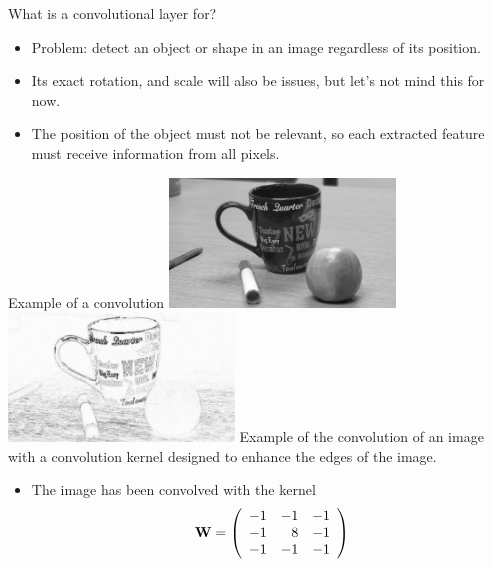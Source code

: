 \documentclass{beamer}
\begin{document}
\begin{frame}{What is a convolutional layer for?}

\begin{itemize}
\item Problem: detect an object or shape in an image regardless of its position.

\item Its exact rotation, and scale will also be issues, but let's not mind this for now.

\item The position of the object must not be relevant, so each extracted  feature must receive information from all pixels.
\end{itemize}
\end{frame}
\begin{frame}{Example of a convolution}
\includegraphics[width=0.45\textwidth]{Module 4 (CNN)/pics/I.jpg}
    \includegraphics[width=0.45\textwidth]{Module 4 (CNN)/pics/O_processed.png}
    {Example of the convolution of an image with a convolution kernel designed to enhance the edges of the image. }
\begin{itemize}
    \item The image has been convolved with the kernel 
    \begin{equation}
    {\bf W} =
    \left( 
    \begin{array}{rrr}
         -1 & -1 & -1  \\
         -1 & 8 & -1  \\
         -1 & -1 & -1  \\
    \end{array}
    \right)
\end{equation}

\end{itemize}
\end{frame}
\end{document}
